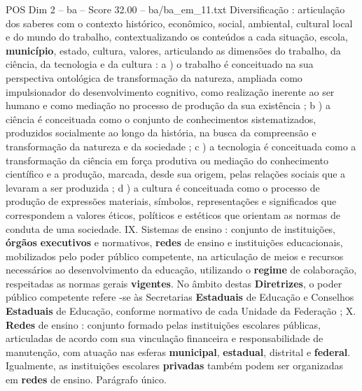 \begin{textsample}{POS Dim 2 – ba – Score 32.00 – ba/ba\_em\_11.txt}
Diversificação : articulação dos saberes com o contexto histórico, econômico, social, ambiental, cultural local e do mundo do trabalho, contextualizando os conteúdos a cada situação, escola, \textbf{município}, estado, cultura, valores, articulando as dimensões do trabalho, da ciência, da tecnologia e da cultura : a ) o trabalho é conceituado na sua perspectiva ontológica de transformação da natureza, ampliada como impulsionador do desenvolvimento cognitivo, como realização inerente ao ser humano e como mediação no processo de produção da sua existência ; b ) a ciência é conceituada como o conjunto de conhecimentos sistematizados, produzidos socialmente ao longo da história, na busca da compreensão e transformação da natureza e da sociedade ; c ) a tecnologia é conceituada como a transformação da ciência em força produtiva ou mediação do conhecimento científico e a produção, marcada, desde sua origem, pelas relações sociais que a levaram a ser produzida ; d ) a cultura é conceituada como o processo de produção de expressões materiais, símbolos, representações e significados que correspondem a valores éticos, políticos e estéticos que orientam as normas de conduta de uma sociedade.
IX.
Sistemas de ensino : conjunto de instituições, \textbf{órgãos} \textbf{executivos} e normativos, \textbf{redes} de ensino e instituições educacionais, mobilizados pelo poder público competente, na articulação de meios e recursos necessários ao desenvolvimento da educação, utilizando o \textbf{regime} de colaboração, respeitadas as normas gerais \textbf{vigentes}.
No âmbito destas \textbf{Diretrizes}, o poder público competente refere -se às Secretarias \textbf{Estaduais} de Educação e Conselhos \textbf{Estaduais} de Educação, conforme normativo de cada Unidade da Federação ; X. \textbf{Redes} de ensino : conjunto formado pelas instituições escolares públicas, articuladas de acordo com sua vinculação financeira e responsabilidade de manutenção, com atuação nas esferas \textbf{municipal}, \textbf{estadual}, distrital e \textbf{federal}.
Igualmente, as instituições escolares \textbf{privadas} também podem ser organizadas em \textbf{redes} de ensino.
Parágrafo único.

\end{textsample}
